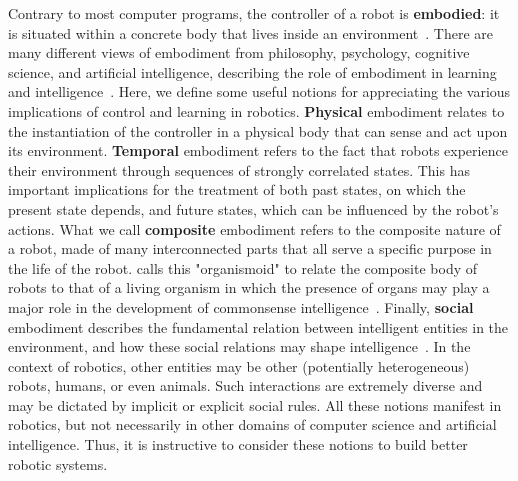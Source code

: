Contrary to most computer programs, the controller of a robot is \textbf{embodied}: it is situated within a concrete body that lives inside an environment~\citep{Pfeifer2006_Embodiment}. There are many different views of embodiment from philosophy, psychology, cognitive science, and artificial intelligence, describing the role of embodiment in learning and intelligence~\citep{Lakoff1999_PhiloInTheFlesh, Barsalou2003_SocialEmbodiment, Kiverstein2012_Embodiment, Sunderhauf2018_Limits}. Here, we define some useful notions for appreciating the various implications of control and learning in robotics.
\textbf{Physical} embodiment relates to the instantiation of the controller in a physical body that can sense and act upon its environment. 
\textbf{Temporal} embodiment refers to the fact that robots experience their environment through sequences of strongly correlated states. This has important implications for the treatment of both past states, on which the present state depends, and future states, which can be influenced by the robot's actions. 
What we call \textbf{composite} embodiment refers to the composite nature of a robot, made of many interconnected parts that all serve a specific purpose in the life of the robot. \cite{Ziemke2003_Embodiment} calls this "organismoid" to relate the composite body of robots to that of a living organism in which the presence of organs may play a major role in the development of commonsense intelligence~\citep{Lakoff1999_PhiloInTheFlesh}. 
Finally, \textbf{social} embodiment describes the fundamental relation between intelligent entities in the environment, and how these social relations may shape intelligence~\citep{Barsalou2003_SocialEmbodiment}. In the context of robotics, other entities may be other (potentially heterogeneous) robots, humans, or even animals. Such interactions are extremely diverse and may be dictated by implicit or explicit social rules. 
All these notions manifest in robotics, but not necessarily in other domains of computer science and artificial intelligence. Thus, it is instructive to consider these notions to build better robotic systems.

